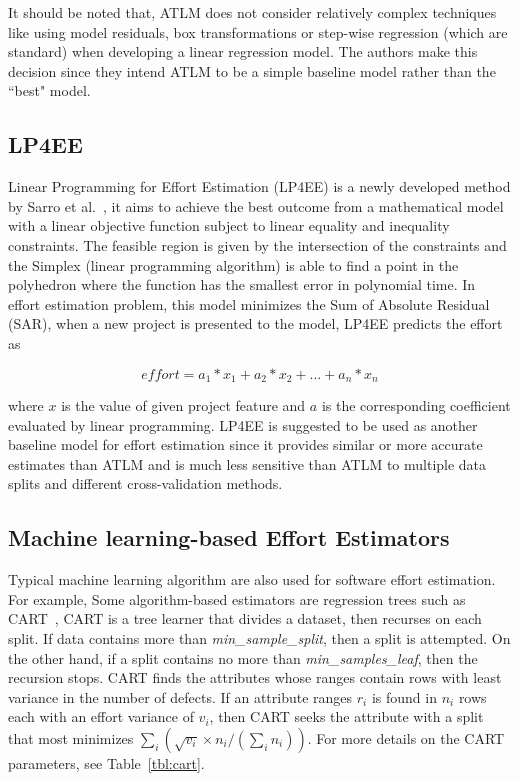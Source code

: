 \documentclass[sigconf,review]{acmart}
\begin{document}
It should be noted that, ATLM does not consider relatively complex techniques like using model residuals,  box transformations or step-wise regression (which are standard) when developing a linear regression model. The authors make this decision since they intend ATLM to be a simple baseline model rather than the ``best" model.


\subsection{LP4EE}
\label{sec:lp4ee}
Linear Programming for Effort Estimation (LP4EE) is a newly developed method by Sarro et al.~\cite{SarroTOSEM2018}, it aims to achieve the best outcome from a mathematical
model with a linear objective function subject to linear equality and inequality
constraints. The feasible region is given by the intersection of the constraints and the
Simplex (linear programming algorithm) is able to find a point in the polyhedron where
the function has the smallest error in polynomial time. In effort estimation problem, this model minimizes the Sum of Absolute Residual (SAR), when a new project is presented to the model, LP4EE predicts the effort as

\[
\mathit{effort} = a_1*x_1 + a_2*x_2 + ... + a_n*x_n
\]

where $x$ is the value of given project feature and $a$ is the corresponding coefficient evaluated by linear programming.
LP4EE is suggested to be used as another baseline model for effort estimation since it provides
similar or more accurate estimates than ATLM and is much less sensitive than ATLM
to multiple data splits and different cross-validation methods.

\subsection{Machine learning-based Effort Estimators}
\label{sec:algo}


\newcommand{\centered}[1]{\begin{tabular}{l} #1 \end{tabular}}



Typical machine learning algorithm are also used for software effort estimation. For example, Some algorithm-based estimators are regression trees such as CART~\cite{brieman84}, 
CART is a  tree learner that divides a dataset, then recurses
on each split.
If data contains more than {\em min\_sample\_split}, then a split is attempted.
On the other hand, if a split contains no more than {\em min\_samples\_leaf}, then the recursion stops. 
CART finds the attributes whose ranges contain rows with least variance in the number
of defects. If an  attribute ranges $r_i$ is found in 
$n_i$ rows each with an effort  variance of $v_i$, then CART seeks the  attribute with a split that most
minimizes $\sum_i \left(\sqrt{v_i}\times n_i/(\sum_i n_i)\right)$.
For more details on the CART parameters, see Table~\ref{tbl:cart}.
\end{document}
